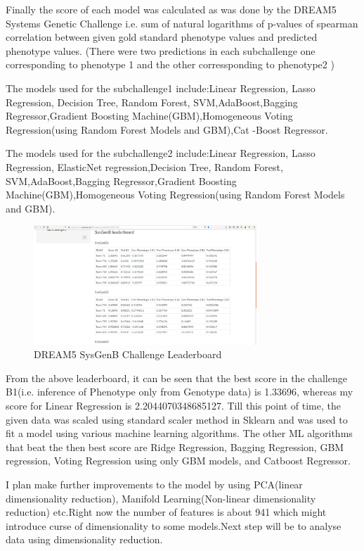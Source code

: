 \documentclass{ifacconf}
\begin{document}
Finally the score of each model was calculated as was done by the DREAM5 Systems Genetic Challenge i.e. sum of natural logarithms of p-values of spearman correlation between given gold standard phenotype values and predicted phenotype values. (There were two predictions in each subchallenge one corresponding to phenotype 1 and the other corressponding to phenotype2 )

The models used for the subchallenge1 include:Linear Regression, Lasso Regression, Decision Tree, Random Forest, SVM,AdaBoost,Bagging Regressor,Gradient Boosting Machine(GBM),Homogeneous Voting Regression(using Random Forest Models and GBM),Cat
-Boost Regressor.

The models used for the subchallenge2 include:Linear Regression, Lasso Regression, ElasticNet regression,Decision Tree, Random Forest, SVM,AdaBoost,Bagging Regressor,Gradient Boosting Machine(GBM),Homogeneous Voting Regression(using Random Forest Models and GBM).

\begin{figure}
\begin{center}
\includegraphics[width=8.4cm]{leaderboard}    %
\caption{DREAM5 SysGenB Challenge Leaderboard } 
\label{fig:leaderboard}
\end{center}
\end{figure}

From the above leaderboard, it can be seen that the best score in the challenge B1(i.e. inference of Phenotype only from Genotype data) is 1.33696, whereas my score for Linear Regression is 2.2044070348685127.
Till this point of time, the given data was scaled using standard scaler method in Sklearn and was used to fit a model using various machine learning algorithms. The other ML algorithms that beat the then best score are Ridge Regression, Bagging Regression, GBM regression, Voting Regression using only GBM models, and Catboost Regressor.

I plan make further improvements to the model by using PCA(linear dimensionality reduction), Manifold Learning(Non-linear dimensionality reduction) etc.Right now the number of features is about 941 which might introduce curse of dimensionality to some models.Next step will be to analyse data using dimensionality reduction.
\end{document}
